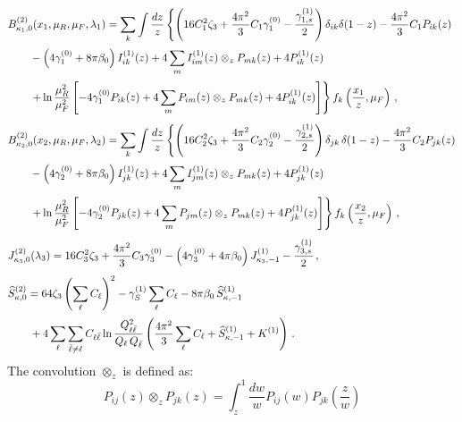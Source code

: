 \begin{subequations}
\label{eq:C20-ingred}
\begin{align}
&B_{\kappa_{1},0}^{(2)}(x_1,\mu_R,\mu_F,\lambda_1) = \sum_{k}\int\frac{dz}{z}
   \left\{ \left(16C_1^2\zeta_3+\frac{4\pi^2}{3}C_1\gamma_1^{(0)}
    -\frac{\gamma_{1,s}^{(1)}}{2}\right)\delta_{ik}\delta(1-z)
    -\frac{4\pi^2}{3}C_1 P_{ik}(z) \right.\notag\\[0.5ex]
  &\qquad-\left(4\gamma_1^{(0)}+8\pi\beta_0\right)I_{ik}^{(1)}(z)
    +4\sum_m I_{im}^{(1)}(z)\otimes_z P_{mk}(z)+4P_{ik}^{(1)}(z) \notag\\[0.5ex]
  &\qquad\left.+\ln\frac{\mu_R^2}{\mu_F^2}\left[-4\gamma_1^{(0)}P_{ik}(z)
    +4\sum_m P_{im}(z)\otimes_z P_{mk}(z)+4P_{ik}^{(1)}(z)\right]\right\}f_k\left(\frac{x_1}{z},\mu_F\right)\,, \\[1ex]
&B_{\kappa_{2},0}^{(2)}(x_2,\mu_R,\mu_F,\lambda_2) = \sum_{k}\int\frac{dz}{z}
   \left\{ \left(16C_2^2\zeta_3+\frac{4\pi^2}{3}C_2\gamma_2^{(0)}
    -\frac{\gamma_{2,s}^{(1)}}{2}\right)\delta_{jk}\,\delta(1-z)
    -\frac{4\pi^2}{3}C_2 P_{jk}(z) \right.\notag\\[0.5ex]
  &\qquad-\left(4\gamma_2^{(0)}+8\pi\beta_0\right)I_{jk}^{(1)}(z)
    +4\sum_m I_{jm}^{(1)}(z)\otimes_z P_{mk}(z)+4P_{jk}^{(1)}(z) \notag\\[0.5ex]
  &\qquad\left.+\ln\frac{\mu_R^2}{\mu_F^2}\left[-4\gamma_2^{(0)}P_{jk}(z)
    +4\sum_m P_{jm}(z)\otimes_z P_{mk}(z)+4P_{jk}^{(1)}(z)\right]\right\}f_k\left(\frac{x_2}{z},\mu_F\right)\,, \\[1ex]
    &J_{\kappa_3,0}^{(2)}(\lambda_3) = 16C_3^2\zeta_3+\frac{4\pi^2}{3}C_3\gamma_3^{(0)}
    -\left(4\gamma_3^{(0)}+4\pi\beta_0\right)J_{\kappa_3,-1}^{(1)}
    -\frac{\gamma_{3,s}^{(1)}}{2}\,, \\[1ex]
&\widehat{S}_{\kappa,0}^{(2)} =
    64\zeta_3\left(\sum_{\ell}C_{\ell}\right)^2-\gamma_S^{(1)}\sum_{\ell}C_{\ell}
    -8\pi\beta_0\,\widehat{S}_{\kappa,-1}^{(1)} \notag\\[0.5ex]
  &\qquad+4\sum_{\ell}\sum_{\bar{\ell}\neq\ell}C_{\ell\bar\ell}\ln\frac{Q_{\ell\bar{\ell}}^2}{Q_{\ell}\,Q_{\bar{\ell}}}\left(\frac{4\pi^2}{3}\sum_{\ell}C_{\ell}+\widehat{S}_{\kappa,-1}^{(1)}+K^{(1)}\right)\,.
\end{align}
\end{subequations}
The convolution $\otimes_z$ is defined as:
\begin{equation}
P_{ij}(z)\otimes_z P_{jk}(z)=\int_z^1\frac{dw}{w}P_{ij}(w)P_{jk}\left(\frac{z}{w}\right)
\end{equation}
